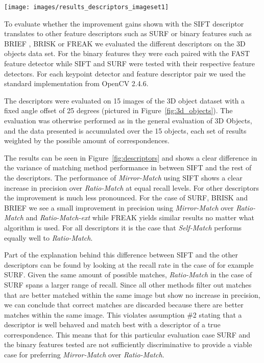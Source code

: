 \documentclass[journal]{IEEEtran}
\begin{document}
\begin{figure*}[t]
    \centering
    \texttt{[image: images/results\_descriptors\_imageset1]}
    \caption{Keypoint / Descriptor combinations measured on 15 pairs of 
    photos of 3D objects taken 15 degrees apart. K = Keypoint, D = 
Descriptor.}
    \label{fig:descriptors}
\end{figure*}

To evaluate whether the improvement gains shown with the SIFT descriptor 
translates to other feature descriptors such as SURF \cite{bay2006surf} 
or binary features such as BRIEF \cite{calonder2010brief}, BRISK 
\cite{leutenegger2011brisk} or FREAK \cite{alahi2012freak} we evaluated 
the different descriptors on the 3D objects data set.  For the binary 
features they were each paired with the FAST feature detector while SIFT 
and SURF were tested with their respective feature detectors.  For each 
keypoint detector and feature descriptor pair we used the standard 
implementation from OpenCV 2.4.6.

The descriptors were evaluated on 15 images of the 3D object dataset 
with a fixed angle offset of 25 degrees (pictured in 
Figure~\ref{fig:3d_objects}).  The evaluation was otherwise performed as
in the general evaluation of 3D Objects, and the data presented is 
accumulated over the 15 objects, each set of results weighted by the 
possible amount of correspondences.

The results can be seen in Figure~\ref{fig:descriptors} and shows a 
clear difference in the variance of matching method performance in 
between SIFT and the rest of the descriptors. The performance of 
\emph{Mirror-Match} using SIFT shows a clear increase in precision over 
\emph{Ratio-Match} at equal recall levels. For other descriptors the 
improvement is much less pronounced.  For the case of SURF, BRISK and 
BRIEF we see a small improvement in precision using \emph{Mirror-Match} 
over \emph{Ratio-Match} and \emph{Ratio-Match-ext} while FREAK yields 
similar results no matter what algorithm is used. For all descriptors it 
is the case that \emph{Self-Match} performs equally well to 
\emph{Ratio-Match}.

Part of the explanation behind this difference between SIFT and the 
other descriptors can be found by looking at the recall rate in the case
of for example SURF\@. Given the same amount of possible matches, 
\emph{Ratio-Match} in the case of SURF spans a larger range of recall.  
Since all other methods filter out matches that are better matched 
within the same image but show no increase in precision, we can conclude 
that correct matches are discarded because there are better matches 
within the same image. This violates assumption \#2 stating that a 
descriptor is well behaved and match best with a descriptor of a true 
correspondence. This means that for this particular evaluation case SURF 
and the binary features tested are not sufficiently discriminative to 
provide a viable case for preferring \emph{Mirror-Match} over 
\emph{Ratio-Match}.
\end{document}
